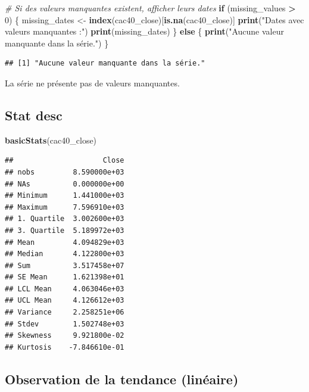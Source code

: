 \documentclass[
]{article}
\newenvironment{Shaded}{\begin{snugshade}}{\end{snugshade}}
\newcommand{\CommentTok}[1]{\textcolor[rgb]{0.56,0.35,0.01}{\textit{#1}}}
\newcommand{\ControlFlowTok}[1]{\textcolor[rgb]{0.13,0.29,0.53}{\textbf{#1}}}
\newcommand{\DecValTok}[1]{\textcolor[rgb]{0.00,0.00,0.81}{#1}}
\newcommand{\FunctionTok}[1]{\textcolor[rgb]{0.13,0.29,0.53}{\textbf{#1}}}
\newcommand{\NormalTok}[1]{#1}
\newcommand{\OtherTok}[1]{\textcolor[rgb]{0.56,0.35,0.01}{#1}}
\newcommand{\SpecialCharTok}[1]{\textcolor[rgb]{0.81,0.36,0.00}{\textbf{#1}}}
\newcommand{\StringTok}[1]{\textcolor[rgb]{0.31,0.60,0.02}{#1}}
\begin{document}
\begin{Shaded}
\begin{Highlighting}[]
\CommentTok{\# Si des valeurs manquantes existent, afficher leurs dates}
\ControlFlowTok{if}\NormalTok{ (missing\_values }\SpecialCharTok{\textgreater{}} \DecValTok{0}\NormalTok{) \{}
\NormalTok{  missing\_dates }\OtherTok{\textless{}{-}} \FunctionTok{index}\NormalTok{(cac40\_close)[}\FunctionTok{is.na}\NormalTok{(cac40\_close)]}
  \FunctionTok{print}\NormalTok{(}\StringTok{"Dates avec valeurs manquantes :"}\NormalTok{)}
  \FunctionTok{print}\NormalTok{(missing\_dates)}
\NormalTok{\} }\ControlFlowTok{else}\NormalTok{ \{}
  \FunctionTok{print}\NormalTok{(}\StringTok{"Aucune valeur manquante dans la série."}\NormalTok{)}
\NormalTok{\}}
\end{Highlighting}
\end{Shaded}

\begin{verbatim}
## [1] "Aucune valeur manquante dans la série."
\end{verbatim}

La série ne présente pas de valeurs manquantes.

\hypertarget{stat-desc}{%
\subsection{Stat desc}\label{stat-desc}}

\begin{Shaded}
\begin{Highlighting}[]
\FunctionTok{basicStats}\NormalTok{(cac40\_close)}
\end{Highlighting}
\end{Shaded}

\begin{verbatim}
##                     Close
## nobs         8.590000e+03
## NAs          0.000000e+00
## Minimum      1.441000e+03
## Maximum      7.596910e+03
## 1. Quartile  3.002600e+03
## 3. Quartile  5.189972e+03
## Mean         4.094829e+03
## Median       4.122800e+03
## Sum          3.517458e+07
## SE Mean      1.621398e+01
## LCL Mean     4.063046e+03
## UCL Mean     4.126612e+03
## Variance     2.258251e+06
## Stdev        1.502748e+03
## Skewness     9.921800e-02
## Kurtosis    -7.846610e-01
\end{verbatim}

\hypertarget{observation-de-la-tendance-linuxe9aire}{%
\subsection{Observation de la tendance
(linéaire)}\label{observation-de-la-tendance-linuxe9aire}}
\end{document}
